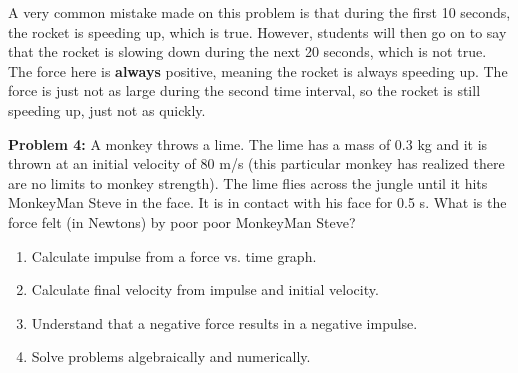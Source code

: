 \begin{tutorialbox}[title = Student Issue: Negative Slope $\neq$ Slowing Down]
    A very common mistake made on this problem is that during the first 10 seconds, the rocket 
    is speeding up, which is true.  However, students will then go on to say that the rocket is
    slowing down during the next 20 seconds, which is not true.  The force here is \textbf{always}
    positive, meaning the rocket is always speeding up.  The force is just not as large during
    the second time interval, so the rocket is still speeding up, just not as quickly.
\end{tutorialbox}

\vspace{2em}

\noindent
\textbf{Problem 4:} A monkey throws a lime.  The lime has a mass of 0.3 kg and it is 
thrown at an initial velocity of 80 m/s (this particular monkey has realized there are 
no limits to monkey strength). The lime flies across the jungle until it hits MonkeyMan 
Steve in the face.  It is in contact with his face for 0.5 s.  What is the force felt 
(in Newtons) by poor poor MonkeyMan Steve?

\begin{problembox}[title=Learning Outcomes: Impulse in One Dimension]
\begin{enumerate}[label=(\alph*)]
    \item Calculate impulse from a force vs. time graph.
    \item Calculate final velocity from impulse and initial velocity.
    \item Understand that a negative force results in a negative impulse.
    \item Solve problems algebraically and numerically.
\end{enumerate}
\end{problembox}